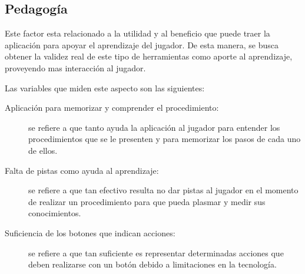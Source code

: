\subsection{Pedagogía}

Este factor esta relacionado a la utilidad y al beneficio que puede traer la
aplicación para apoyar el aprendizaje del jugador. De esta manera, se busca
obtener la validez real de este tipo de herramientas como aporte al aprendizaje,
proveyendo mas interacción al jugador.

Las variables que miden este aspecto son las siguientes:

\begin{description}

\item[Aplicación para memorizar y comprender el procedimiento:] se refiere a que
    tanto ayuda la aplicación al jugador para entender los procedimientos que se
    le presenten y para memorizar los pasos de cada uno de ellos.

\item[Falta de pistas como ayuda al aprendizaje:] se refiere a que tan efectivo
    resulta no dar pistas al jugador en el momento de realizar un procedimiento
    para que pueda plasmar y medir sus conocimientos.

\item[Suficiencia de los botones que indican acciones:] se refiere a que tan
    suficiente es representar determinadas acciones que deben realizarse con un
    botón debido a limitaciones en la tecnología.

\end{description}
